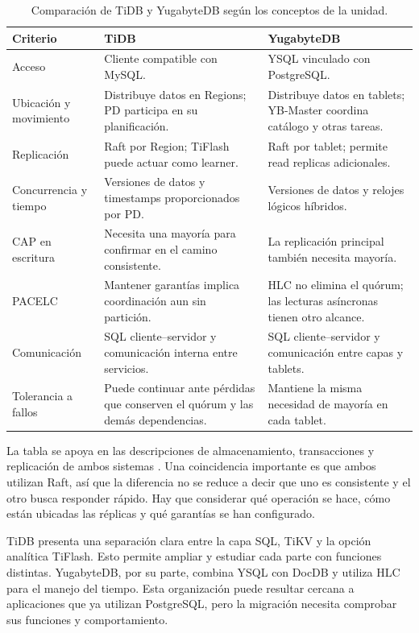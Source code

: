 \documentclass[11pt,a4paper]{article}
\begin{document}
\begin{table}[H]
\centering\small
\caption{Comparación de TiDB y YugabyteDB según los conceptos de la unidad.}
\label{tab:comparacion}
\begin{tabularx}{\linewidth}{>{\raggedright\arraybackslash}p{2.6cm}XX}
\toprule
\textbf{Criterio} & \textbf{TiDB} & \textbf{YugabyteDB}\\
\midrule
Acceso & Cliente compatible con MySQL. & YSQL vinculado con PostgreSQL.\\
Ubicación y movimiento & Distribuye datos en Regions; PD participa en su planificación. & Distribuye datos en tablets; YB-Master coordina catálogo y otras tareas.\\
Replicación & Raft por Region; TiFlash puede actuar como learner. & Raft por tablet; permite read replicas adicionales.\\
Concurrencia y tiempo & Versiones de datos y timestamps proporcionados por PD. & Versiones de datos y relojes lógicos híbridos.\\
CAP en escritura & Necesita una mayoría para confirmar en el camino consistente. & La replicación principal también necesita mayoría.\\
PACELC & Mantener garantías implica coordinación aun sin partición. & HLC no elimina el quórum; las lecturas asíncronas tienen otro alcance.\\
Comunicación & SQL cliente--servidor y comunicación interna entre servicios. & SQL cliente--servidor y comunicación entre capas y tablets.\\
Tolerancia a fallos & Puede continuar ante pérdidas que conserven el quórum y las demás dependencias. & Mantiene la misma necesidad de mayoría en cada tablet.\\
\bottomrule
\end{tabularx}
\end{table}

La tabla se apoya en las descripciones de almacenamiento, transacciones y replicación de ambos sistemas \cite{tidb_tikv,tidb_storage,yb_arch,yb_tx,yb_repl,yb_read}. Una coincidencia importante es que ambos utilizan Raft, así que la diferencia no se reduce a decir que uno es consistente y el otro busca responder rápido. Hay que considerar qué operación se hace, cómo están ubicadas las réplicas y qué garantías se han configurado.

TiDB presenta una separación clara entre la capa SQL, TiKV y la opción analítica TiFlash. Esto permite ampliar y estudiar cada parte con funciones distintas. YugabyteDB, por su parte, combina YSQL con DocDB y utiliza HLC para el manejo del tiempo. Esta organización puede resultar cercana a aplicaciones que ya utilizan PostgreSQL, pero la migración necesita comprobar sus funciones y comportamiento.
\end{document}

